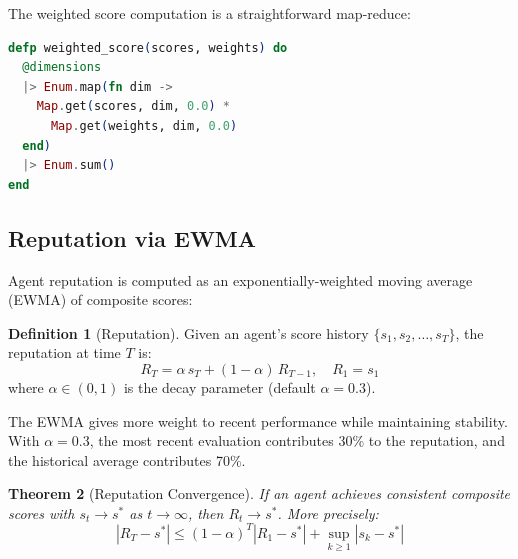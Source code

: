 \documentclass[12pt,a4paper]{article}
\newtheorem{theorem}{Theorem}[section]
\theoremstyle{definition}
\newtheorem{definition}[theorem]{Definition}
\theoremstyle{remark}
\begin{document}
The weighted score computation is a straightforward map-reduce:

\begin{lstlisting}[language=elixir, caption={Weighted score as a fold (from \texttt{evaluator.ex})}, label={lst:weighted-score}]
defp weighted_score(scores, weights) do
  @dimensions
  |> Enum.map(fn dim ->
    Map.get(scores, dim, 0.0) *
      Map.get(weights, dim, 0.0)
  end)
  |> Enum.sum()
end
\end{lstlisting}

\subsection{Reputation via EWMA}

Agent reputation is computed as an exponentially-weighted moving average (EWMA) of composite scores:

\begin{definition}[Reputation]\label{def:reputation}
Given an agent's score history $\{s_1, s_2, \ldots, s_T\}$, the reputation at time $T$ is:
\begin{equation}\label{eq:reputation}
  R_T = \alpha \, s_T + (1 - \alpha) \, R_{T-1}, \quad R_1 = s_1
\end{equation}
where $\alpha \in (0,1)$ is the decay parameter (default $\alpha = 0.3$).
\end{definition}

The EWMA gives more weight to recent performance while maintaining stability. With $\alpha = 0.3$, the most recent evaluation contributes 30\% to the reputation, and the historical average contributes 70\%.

\begin{theorem}[Reputation Convergence]\label{thm:reputation-convergence}
If an agent achieves consistent composite scores with $s_t \to s^*$ as $t \to \infty$, then $R_t \to s^*$. More precisely:
\begin{equation}
  |R_T - s^*| \leq (1-\alpha)^T |R_1 - s^*| + \sup_{k \geq 1} |s_k - s^*|
\end{equation}
\end{theorem}
\end{document}
